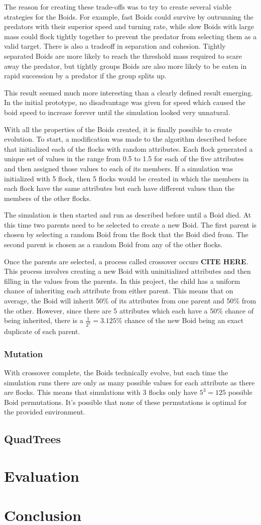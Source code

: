 \documentclass{egpubl}
\begin{document}
The reason for creating these trade-offs was to try to create several viable strategies for the Boids. For example, fast Boids could survive by outrunning the predators with their superior speed and turning rate, while slow Boids with large mass could flock tightly together to prevent the predator from selecting them as a valid target. There is also a tradeoff in separation and cohesion. Tightly separated Boids are more likely to reach the threshold mass required to scare away the predator, but tightly groups Boids are also more likely to be eaten in rapid succession by a predator if the group splits up.
\par
This result seemed much more interesting than a clearly defined result emerging. In the initial prototype, no disadvantage was given for speed which caused the boid speed to increase forever until the simulation looked very unnatural. 
\par
With all the properties of the Boids created, it is finally possible to create evolution. To start, a modification was made to the algorithm described before that initialized each of the flocks with random attributes. Each flock generated a unique set of values in the range from 0.5 to 1.5 for each of the five attributes and then assigned those values to each of its members. If a simulation was initialized with 5 flock, then 5 flocks would be created in which the members in each flock have the same attributes but each have different values than the members of the other flocks.
\par
The simulation is then started and run as described before until a Boid died. At this time two parents need to be selected to create a new Boid. The first parent is chosen by selecting a random Boid from the flock that the Boid died from. The second parent is chosen as a random Boid from any of the other flocks.
\par
Once the parents are selected, a process called crossover occurs \textbf{CITE HERE}. This process involves creating a new Boid with uninitialized attributes and then filling in the values from the parents. In this project, the child has a uniform chance of inheriting each attribute from either parent. This means that on average, the Boid will inherit 50\% of its attributes from one parent and 50\% from the other. However, since there are 5 attributes which each have a 50\% chance of being inherited, there is a $\frac{1}{2^5} = 3.125\%$ chance of the new Boid being an exact duplicate of each parent.
\subsubsection{Mutation}
With crossover complete, the Boids technically evolve, but each time the simulation runs there are only as many possible values for each attribute as there are flocks. This means that simulations with 3 flocks only have $5^3 = 125$ possible Boid permutations. It's possible that none of these permutations is optimal for the provided environment.
\subsection{QuadTrees}
\label{qtree}
\section{Evaluation}
\section{Conclusion}
\printbibliography                
\end{document}
